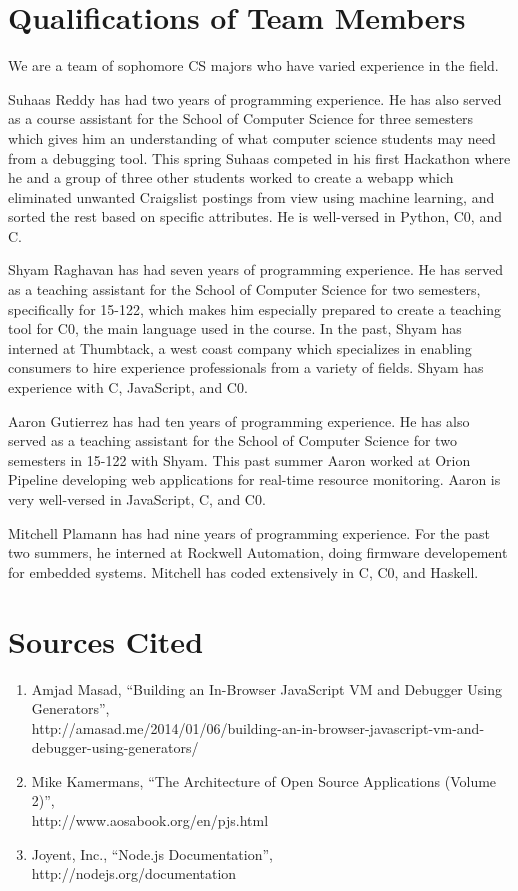 \documentclass[11pt]{article}
\begin{document}
\section{Qualifications of Team Members}
\par
We are a team of sophomore CS majors who have varied experience in the field.
\par
Suhaas Reddy has had two years of programming experience.  He has also served
as a course assistant for the School of Computer Science for three semesters
which gives him an understanding of what computer science students may need
from a debugging tool. This spring Suhaas competed in his first Hackathon where
he and a group of three other students worked to create a webapp which
eliminated unwanted Craigslist postings from view using machine learning, and
sorted the rest based on specific attributes.  He is well-versed in Python, C0,
and C.
\par
Shyam Raghavan has had seven years of programming experience.  He has served as
a teaching assistant for the School of Computer Science for two semesters,
specifically for 15-122, which makes him especially prepared to create a
teaching tool for C0, the main language used in the course.  In the past, Shyam
has interned at Thumbtack, a west coast company which specializes in enabling
consumers to hire experience professionals from a variety of fields.  Shyam has
experience with C, JavaScript, and C0.
\par
Aaron Gutierrez has had ten years of programming experience.  He has also served
as a teaching assistant for the School of Computer Science for two semesters in
15-122 with Shyam. This past summer Aaron worked at Orion Pipeline developing
web applications for real-time resource monitoring. Aaron is very well-versed in
JavaScript, C, and C0.
\par
Mitchell Plamann has had nine years of programming experience.  For the past two
summers, he interned at Rockwell Automation, doing firmware developement for
embedded systems. Mitchell has coded extensively in C, C0, and Haskell.

\section{Sources Cited}
\begin{enumerate}
\item Amjad Masad,
  ``Building an In-Browser JavaScript VM and Debugger Using Generators'',\\
  http://amasad.me/2014/01/06/building-an-in-browser-javascript-vm-and-debugger-using-generators/
\item Mike Kamermans, ``The Architecture of Open Source Applications (Volume 2)'',\\
  http://www.aosabook.org/en/pjs.html
\item Joyent, Inc., ``Node.js Documentation'', \\
  http://nodejs.org/documentation
\end{enumerate}
\end{document}
